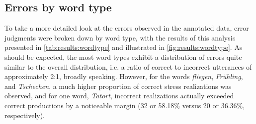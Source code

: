 		\subsection{Errors by word type}
		\label{sec:results:wordtype}
			
			To take a more detailed look at the errors observed in the annotated data, error judgments were broken down by word type, with the results of this analysis presented in \cref{tab:results:wordtype} and illustrated in \cref{fig:results:wordtype}. As should be expected, the most word types exhibit a distribution of errors quite similar to the overall distribution, i.e. a ratio of correct to incorrect utterances of approximately 2:1, broadly speaking. However, for the words \textit{fliegen}, \textit{Fr\"{u}hling}, and \textit{Tschechen}, a much higher proportion of correct stress realizations was observed,
			and for one word, \textit{Tatort}, incorrect realizations actually exceeded correct productions by a noticeable margin (32 or 58.18\% versus 20 or 36.36\%, respectively). 
			
